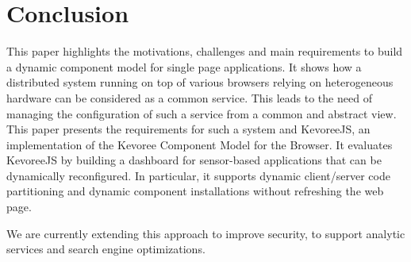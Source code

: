 \section{Conclusion}
This paper highlights the motivations, challenges and main requirements to build a dynamic component model for single page applications. It shows how a distributed system running on top of various browsers relying on heterogeneous hardware can be considered as a common service. This leads to the need of managing the configuration of such a service from a common and abstract view. This paper presents the requirements for such a system and KevoreeJS, an implementation of the Kevoree Component Model for the Browser. It evaluates KevoreeJS by building a dashboard for sensor-based applications that can be dynamically reconfigured. In particular, it supports dynamic client/server code partitioning and dynamic component installations without refreshing the web page.

We are currently extending this approach to improve security, to support analytic services and search engine optimizations. %
